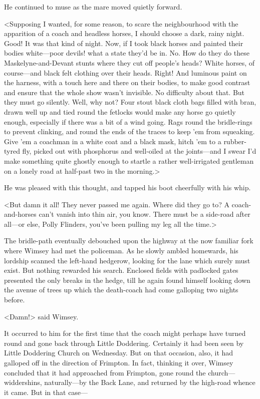 He continued to muse as the mare moved quietly forward.

<Supposing I wanted, for some reason, to scare the neighbourhood with the apparition of a coach and headless horses, I should choose a dark, rainy night. Good! It was that kind of night. Now, if I took black horses and painted their bodies white—poor devils! what a state they'd be in. No. How do they do these Maskelyne-and-Devant stunts where they cut off people's heads? White horses, of course—and black felt clothing over their heads. Right! And luminous paint on the harness, with a touch here and there on their bodies, to make good contrast and ensure that the whole show wasn't invisible. No difficulty about that. But they must go silently. Well, why not? Four stout black cloth bags filled with bran, drawn well up and tied round the fetlocks would make any horse go quietly enough, especially if there was a bit of a wind going. Rags round the bridle-rings to prevent clinking, and round the ends of the traces to keep 'em from squeaking. Give 'em a coachman in a white coat and a black mask, hitch 'em to a rubber-tyred fly, picked out with phosphorus and well-oiled at the joints—and I swear I'd make something quite ghostly enough to startle a rather well-irrigated gentleman on a lonely road at half-past two in the morning.>

He was pleased with this thought, and tapped his boot cheerfully with his whip.

<But damn it all! They never passed me again. Where did they go to? A coach-and-horses can't vanish into thin air, you know. There must be a side-road after all—or else, Polly Flinders, you've been pulling my leg all the time.>

The bridle-path eventually debouched upon the highway at the now familiar fork where Wimsey had met the policeman. As he slowly ambled homewards, his lordship scanned the left-hand hedgerow, looking for the lane which surely must exist. But nothing rewarded his search. Enclosed fields with padlocked gates presented the only breaks in the hedge, till he again found himself looking down the avenue of trees up which the death-coach had come galloping two nights before.

<Damn!> said Wimsey.

It occurred to him for the first time that the coach might perhaps have turned round and gone back through Little Doddering. Certainly it had been seen by Little Doddering Church on Wednesday. But on that occasion, also, it had galloped off in the direction of Frimpton. In fact, thinking it over, Wimsey concluded that it had approached from Frimpton, gone round the church—widdershins, naturally—by the Back Lane, and returned by the high-road whence it came. But in that case—

